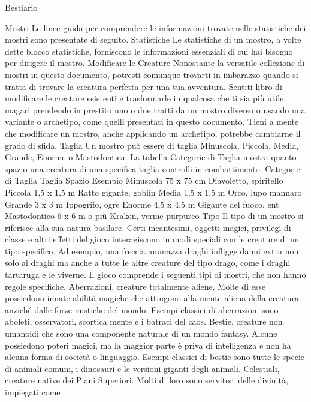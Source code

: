 Bestiario

\begin{multicols}{2}
Mostri
Le linee guida per comprendere le informazioni trovate
nelle statistiche dei mostri sono presentate di seguito.
Statistiche
Le statistiche di un mostro, a volte dette blocco
statistiche, forniscono le informazioni essenziali di cui
hai bisogno per dirigere il mostro.
Modificare le Creature
Nonostante la versatile collezione di mostri in questo documento,
potresti comunque trovarti in imbarazzo quando si tratta di
trovare la creatura perfetta per una tua avventura. Sentiti libro di
modificare le creature esistenti e trasformarle in qualcosa che ti
sia più utile, magari prendendo in prestito uno o due tratti da un
mostro diverso o usando una variante o archetipo, come quelli
presentati in questo documento. Tieni a mente che modificare un
mostro, anche applicando un archetipo, potrebbe cambiarne il
grado di sfida.
Taglia
Un mostro può essere di taglia Minuscola, Piccola,
Media, Grande, Enorme o Mastodontica. La tabella
Categorie di Taglia mostra quanto spazio una creatura
di una specifica taglia controlli in combattimento.
Categorie di Taglia
Taglia Spazio Esempio
Minuscola 75 x 75 cm Diavoletto, spiritello
Piccola 1,5 x 1,5 m Ratto gigante, goblin
Media 1,5 x 1,5 m Orco, lupo mannaro
Grande 3 x 3 m Ippogrifo, ogre
Enorme 4,5 x 4,5 m Gigante del fuoco, ent
Mastodontico 6 x 6 m o più Kraken, verme purpureo
Tipo
Il tipo di un mostro si riferisce alla sua natura basilare.
Certi incantesimi, oggetti magici, privilegi di classe e
altri effetti del gioco interagiscono in modi speciali con
le creature di un tipo specifico. Ad esempio, una freccia
ammazza draghi infligge danni extra non solo ai draghi
ma anche a tutte le altre creature del tipo drago, come i
draghi tartaruga e le viverne.
Il gioco comprende i seguenti tipi di mostri, che non
hanno regole specifiche.
Aberrazioni, creature totalmente aliene. Molte di esse
possiedono innate abilità magiche che attingono alla
mente aliena della creatura anziché dalle forze mistiche
del mondo. Esempi classici di aberrazioni sono aboleti,
osservatori, scortica mente e i batraci del caos.
Bestie, creature non umanoidi che sono una
componente naturale di un mondo fantasy. Alcune
possiedono poteri magici, ma la maggior parte è priva
di intelligenza e non ha alcuna forma di società o
linguaggio. Esempi classici di bestie sono tutte le
specie di animali comuni, i dinosauri e le versioni
giganti degli animali.
Celestiali, creature native dei Piani Superiori. Molti di
loro sono servitori delle divinità, impiegati come

\end{multicols}
